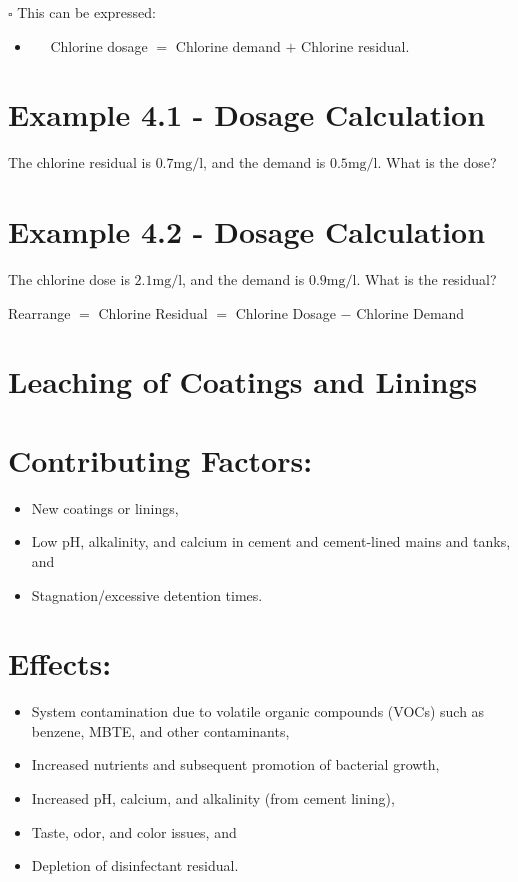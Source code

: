 \documentclass[10pt]{article}
\begin{document}
$\square$ This can be expressed:

\begin{itemize}
  \item $\quad$ Chlorine dosage $=$ Chlorine demand $+$ Chlorine residual.
\end{itemize}
\section{Example 4.1 - Dosage Calculation}
The chlorine residual is $0.7 \mathrm{mg} / \mathrm{l}$, and the demand is $0.5 \mathrm{mg} / \mathrm{l}$. What is the dose?

\section{Example 4.2 - Dosage Calculation}
The chlorine dose is $2.1 \mathrm{mg} / \mathrm{l}$, and the demand is $0.9 \mathrm{mg} / \mathrm{l}$. What is the residual?

Rearrange $=$ Chlorine Residual $=$ Chlorine Dosage $-$ Chlorine Demand

\section{Leaching of Coatings and Linings}
\section{Contributing Factors:}
\begin{itemize}
  \item New coatings or linings,

  \item Low pH, alkalinity, and calcium in cement and cement-lined mains and tanks, and

  \item Stagnation/excessive detention times.

\end{itemize}
\section{Effects:}
\begin{itemize}
  \item System contamination due to volatile organic compounds (VOCs) such as benzene, MBTE, and other contaminants,

  \item Increased nutrients and subsequent promotion of bacterial growth,

  \item Increased pH, calcium, and alkalinity (from cement lining),

  \item Taste, odor, and color issues, and

  \item Depletion of disinfectant residual.

\end{itemize}
\end{document}
